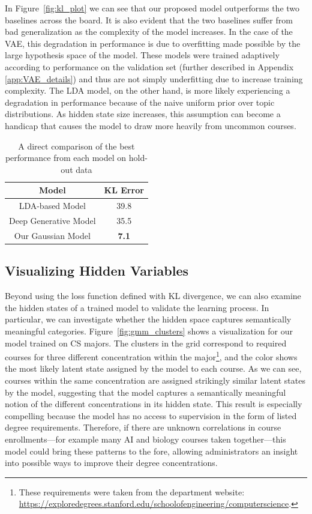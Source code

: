 \documentclass{edm_template}
\begin{document}
In Figure~\ref{fig:kl_plot} we can see that our proposed model outperforms the two baselines across the board. It is also evident that the two baselines suffer from bad generalization as the complexity of the model increases. In the case of the VAE, this degradation in performance is due to overfitting made possible by the large hypothesis space of the model. These models were trained adaptively according to performance on the validation set (further described in Appendix \ref{app:VAE_details}) and thus are not simply underfitting due to increase training complexity. The LDA model, on the other hand, is more likely experiencing a degradation in performance because of the naive uniform prior over topic distributions. As hidden state size increases, this assumption can become a handicap that causes the model to draw more heavily from uncommon courses. 

\begin{table}
    \centering
    \begin{tabular}{|c|c|}
    \hline
    Model & KL Error \\
    \hline
    LDA-based Model & 39.8 \\
    Deep Generative Model & 35.5 \\
    Our Gaussian Model & \textbf{7.1} \\
    \hline
    \end{tabular}
    \caption{A direct comparison of the best performance from each model on hold-out data}
    \label{tab:kl_table}
\end{table}


\subsection{Visualizing Hidden Variables}

Beyond using the loss function defined with KL divergence, we can also examine the hidden states of a trained model to validate the learning process. In particular, we can investigate whether the hidden space captures semantically meaningful categories. Figure~\ref{fig:gmm_clusters} shows a visualization for our model trained on CS majors. The clusters in the grid correspond to required courses for three different concentration within the major\footnote{These requirements were taken from the department website: \url{https://exploredegrees.stanford.edu/schoolofengineering/computerscience}.}, and the color shows the most likely latent state assigned by the model to each course. As we can see, courses within the same concentration are assigned strikingly similar latent states by the model, suggesting that the model captures a semantically meaningful notion of the different concentrations in its hidden state.  This result is especially compelling because the model has no access to supervision in the form of listed degree requirements. Therefore, if there are unknown correlations in course enrollments---for example many AI and biology courses taken together---this model could bring these patterns to the fore, allowing administrators an insight into possible ways to improve their degree concentrations.
\end{document}
